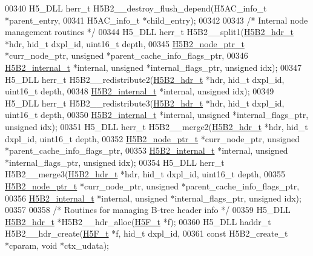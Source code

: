 \begin{DoxyCode}
{{00340 H5\_DLL herr\_t H5B2\_\_destroy\_flush\_depend(H5AC\_info\_t *parent\_entry,
00341     H5AC\_info\_t *child\_entry);
00342 
00343 \textcolor{comment}{/* Internal node management routines */}
00344 H5\_DLL herr\_t H5B2\_\_split1(\hyperlink{struct_h5_b2__hdr__t}{H5B2\_hdr\_t} *hdr, hid\_t dxpl\_id, uint16\_t depth,
00345     \hyperlink{struct_h5_b2__node__ptr__t}{H5B2\_node\_ptr\_t} *curr\_node\_ptr, \textcolor{keywordtype}{unsigned} *parent\_cache\_info\_flags\_ptr,
00346     \hyperlink{struct_h5_b2__internal__t}{H5B2\_internal\_t} *\textcolor{keyword}{internal}, \textcolor{keywordtype}{unsigned} *internal\_flags\_ptr, \textcolor{keywordtype}{unsigned} idx);
00347 H5\_DLL herr\_t H5B2\_\_redistribute2(\hyperlink{struct_h5_b2__hdr__t}{H5B2\_hdr\_t} *hdr, hid\_t dxpl\_id, uint16\_t depth,
00348     \hyperlink{struct_h5_b2__internal__t}{H5B2\_internal\_t} *\textcolor{keyword}{internal}, \textcolor{keywordtype}{unsigned} idx);
00349 H5\_DLL herr\_t H5B2\_\_redistribute3(\hyperlink{struct_h5_b2__hdr__t}{H5B2\_hdr\_t} *hdr, hid\_t dxpl\_id, uint16\_t depth,
00350     \hyperlink{struct_h5_b2__internal__t}{H5B2\_internal\_t} *\textcolor{keyword}{internal}, \textcolor{keywordtype}{unsigned} *internal\_flags\_ptr, \textcolor{keywordtype}{unsigned} idx);
00351 H5\_DLL herr\_t H5B2\_\_merge2(\hyperlink{struct_h5_b2__hdr__t}{H5B2\_hdr\_t} *hdr, hid\_t dxpl\_id, uint16\_t depth,
00352     \hyperlink{struct_h5_b2__node__ptr__t}{H5B2\_node\_ptr\_t} *curr\_node\_ptr, \textcolor{keywordtype}{unsigned} *parent\_cache\_info\_flags\_ptr,
00353     \hyperlink{struct_h5_b2__internal__t}{H5B2\_internal\_t} *\textcolor{keyword}{internal}, \textcolor{keywordtype}{unsigned} *internal\_flags\_ptr, \textcolor{keywordtype}{unsigned} idx);
00354 H5\_DLL herr\_t H5B2\_\_merge3(\hyperlink{struct_h5_b2__hdr__t}{H5B2\_hdr\_t} *hdr, hid\_t dxpl\_id, uint16\_t depth,
00355     \hyperlink{struct_h5_b2__node__ptr__t}{H5B2\_node\_ptr\_t} *curr\_node\_ptr, \textcolor{keywordtype}{unsigned} *parent\_cache\_info\_flags\_ptr,
00356     \hyperlink{struct_h5_b2__internal__t}{H5B2\_internal\_t} *\textcolor{keyword}{internal}, \textcolor{keywordtype}{unsigned} *internal\_flags\_ptr, \textcolor{keywordtype}{unsigned} idx);
00357 
00358 \textcolor{comment}{/* Routines for managing B-tree header info */}
00359 H5\_DLL \hyperlink{struct_h5_b2__hdr__t}{H5B2\_hdr\_t} *H5B2\_\_hdr\_alloc(\hyperlink{struct_h5_f__t}{H5F\_t} *f);
00360 H5\_DLL haddr\_t H5B2\_\_hdr\_create(\hyperlink{struct_h5_f__t}{H5F\_t} *f, hid\_t dxpl\_id,
00361     \textcolor{keyword}{const} H5B2\_create\_t *cparam, \textcolor{keywordtype}{void} *ctx\_udata);
}}
\end{DoxyCode}
